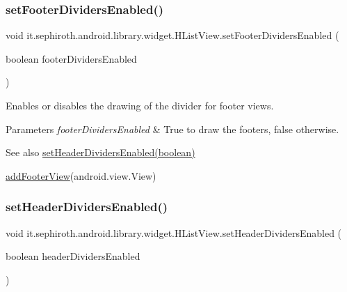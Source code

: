 \subsubsection{\texorpdfstring{set\+Footer\+Dividers\+Enabled()}{setFooterDividersEnabled()}}
{\footnotesize\ttfamily void it.\+sephiroth.\+android.\+library.\+widget.\+H\+List\+View.\+set\+Footer\+Dividers\+Enabled (\begin{DoxyParamCaption}\item[{boolean}]{footer\+Dividers\+Enabled }\end{DoxyParamCaption})}

Enables or disables the drawing of the divider for footer views.


\begin{DoxyParams}{Parameters}
{\em footer\+Dividers\+Enabled} & True to draw the footers, false otherwise.\\
\hline
\end{DoxyParams}
\begin{DoxySeeAlso}{See also}
\hyperlink{classit_1_1sephiroth_1_1android_1_1library_1_1widget_1_1_h_list_view_a1e1dfcddc904321ca76f03224c68829a}{set\+Header\+Dividers\+Enabled(boolean)} 

\hyperlink{classit_1_1sephiroth_1_1android_1_1library_1_1widget_1_1_h_list_view_a6f72feb2fb75c3a2f45e41645cbc9078}{add\+Footer\+View}(android.\+view.\+View) 
\end{DoxySeeAlso}
\mbox{\label{classit_1_1sephiroth_1_1android_1_1library_1_1widget_1_1_h_list_view_a1e1dfcddc904321ca76f03224c68829a}} 
\subsubsection{\texorpdfstring{set\+Header\+Dividers\+Enabled()}{setHeaderDividersEnabled()}}
{\footnotesize\ttfamily void it.\+sephiroth.\+android.\+library.\+widget.\+H\+List\+View.\+set\+Header\+Dividers\+Enabled (\begin{DoxyParamCaption}\item[{boolean}]{header\+Dividers\+Enabled }\end{DoxyParamCaption})}

